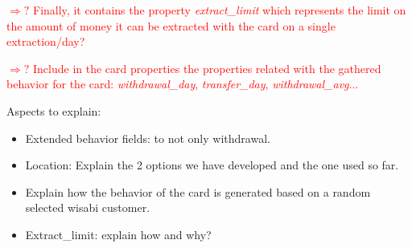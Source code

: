 \documentclass{article}
\begin{document}
\textcolor{red}{$\Rightarrow ?$ Finally, it contains the property \emph{extract\_limit}
which represents the limit on the amount of money it can be extracted with the card on a single 
extraction/day?}

\textcolor{red}{$\Rightarrow ?$ Include in the card properties the properties related with the
gathered behavior for the card: \emph{withdrawal\_day}, \emph{transfer\_day}, 
\emph{withdrawal\_avg}...}

\begin{tcolorbox}
  Aspects to explain:
  \begin{itemize}
    \item Extended behavior fields: to not only withdrawal.
    \item Location: Explain the 2 options we have developed and the one used so far.
    \item Explain how the behavior of the card is generated based on a random
    selected wisabi customer.
    \item Extract\_limit: explain how and why?
  \end{itemize}
\end{tcolorbox}
\end{document}
